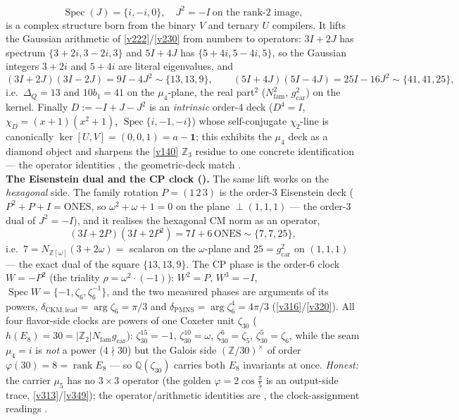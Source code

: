 \documentclass[11pt,a4paper]{article}
\newcommand{\gcar}{g_{\mathrm{car}}}
\newcommand{\Nfam}{N_{\mathrm{fam}}}
\newcommand{\Z}{\mathbb{Z}}
\theoremstyle{definition}
\begin{document}
\begin{keybox}
\[  \operatorname{Spec}(J)=\{i,-i,0\},\quad J^2=-I\ \text{on the rank-2 image},
\]
is a complex structure born from the binary $V$ and ternary $U$ compilers. It lifts the Gaussian
arithmetic of \vref{v222}/\vref{v230} from numbers to operators: $3I{+}2J$ has spectrum
$\{3{+}2i,3{-}2i,3\}$ and $5I{+}4J$ has $\{5{+}4i,5{-}4i,5\}$, so the Gaussian integers $3{+}2i$ and
$5{+}4i$ are literal eigenvalues, and
\[
  (3I{+}2J)(3I{-}2J)=9I-4J^2\sim\{13,13,9\},\qquad (5I{+}4J)(5I{-}4J)=25I-16J^2\sim\{41,41,25\},
\]
i.e.\ $\Delta_Q=13$ and $10b_1=41$ on the $\mu_4$-plane, the real part$^2$ ($\Nfam^2$, $\gcar^2$) on the
kernel. Finally $D:=-I+J-J^2$ is an \emph{intrinsic} order-$4$ deck ($D^4=I$, $\chi_D=(x{+}1)(x^2{+}1)$,
$\operatorname{Spec}\{i,-1,-i\}$) whose self-conjugate $\chi_2$-line is canonically
$\ker[U,V]=(0,0,1)=a-\mathbf 1$; this exhibits the $\mu_4$ deck as a diamond object and sharpens the
\vref{v140} $\Z_3$ residue to one concrete identification --- the operator identities \mE, the
geometric-deck match \mC.
\smallskip\\
\noindent\textbf{The Eisenstein dual and the CP clock ().}
The same lift works on the \emph{hexagonal} side. The family rotation $P=(1\,2\,3)$ is the order-$3$
Eisenstein deck ($P^2+P+I=\mathrm{ONES}$, so $\omega^2+\omega+1=0$ on the plane $\perp(1,1,1)$ --- the
order-$3$ dual of $J^2=-I$), and it realises the hexagonal CM norm as an operator,
\[
  (3I+2P)(3I+2P^2)=7I+6\,\mathrm{ONES}\sim\{7,7,25\},
\]
i.e.\ $7=N_{\Z[\omega]}(3{+}2\omega)=$ scalaron on the $\omega$-plane and $25=\gcar^2$ on $(1,1,1)$ ---
the exact dual of the square $\{13,13,9\}$. The CP phase is the order-$6$ clock $W=-P^2$ (the triality
$\rho=\omega^2{\cdot}({-}1)$): $W^2=P$, $W^3=-I$, $\operatorname{Spec}W=\{-1,\zeta_6,\zeta_6^{-1}\}$, and the
two measured phases are arguments of its powers, $\delta_{\mathrm{CKM,lead}}=\arg\zeta_6=\pi/3$ and
$\delta_{\mathrm{PMNS}}=\arg\zeta_6^4=4\pi/3$ (\vref{v316}/\vref{v320}). All four flavor-side clocks are
powers of one Coxeter unit $\zeta_{30}$ ($h(E_8)=30=|\Z_2|\Nfam\gcar$): $\zeta_{30}^{15}=-1$,
$\zeta_{30}^{10}=\omega$, $\zeta_{30}^{6}=\zeta_5$, $\zeta_{30}^{5}=\zeta_6$, while the seam $\mu_4=i$ is
\emph{not} a power ($4\nmid30$) but the Galois side $(\Z/30)^\times$ of order
$\varphi(30)=8=\operatorname{rank}E_8$ --- so $\mathbb Q(\zeta_{30})$ carries both $E_8$ invariants at
once. \emph{Honest:} the carrier $\mu_5$ has no $3{\times}3$ operator (the golden $\varphi=2\cos\tfrac\pi5$
is an output-side trace, \vref{v313}/\vref{v349}); the operator/arithmetic identities are \mE, the
clock-assignment readings \mC.
\end{keybox}
\end{document}
